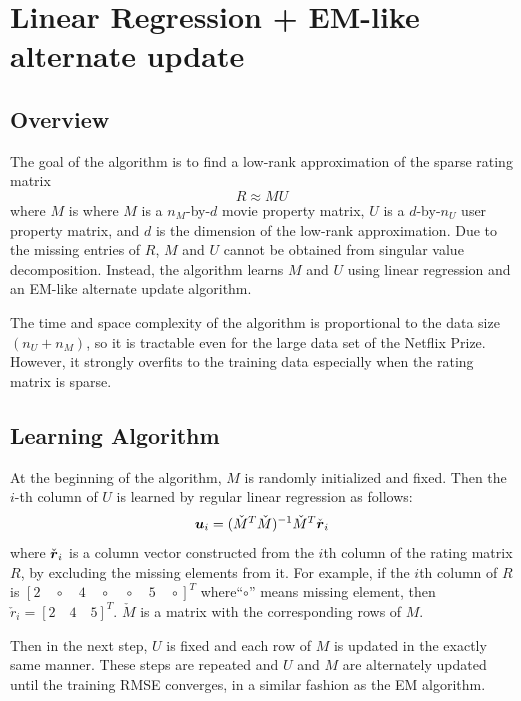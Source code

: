 \documentclass{article}
\begin{document}
\fi

\section{Linear Regression + EM-like alternate update}

\subsection{Overview}
The goal of the algorithm is to find a low-rank approximation of the sparse rating matrix 
\begin{equation}
R \approx MU
\end{equation}
where $M$ is where $M$ is a $n_M$-by-$d$ movie property matrix, $U$ is a
$d$-by-$n_U$ user property matrix, and $d$ is the dimension of the
low-rank approximation. Due to the missing entries of $R$, $M$ and $U$
cannot be obtained from singular value decomposition. Instead, the
algorithm learns $M$ and $U$ using linear regression and an EM-like
alternate update algorithm.

The time and space complexity of the algorithm is proportional to the
data size $(n_U+n_M)$, so it is tractable even for the large data set
of the Netflix Prize. However, it strongly overfits to the training
data especially when the rating matrix is sparse.

\subsection{Learning Algorithm}

At the beginning of the algorithm, $M$ is randomly initialized and
fixed. Then the $i$-th column of $U$ is learned by regular linear
regression as follows:
\begin{equation}
{\mbox{\boldmath $u$}}_i=(\check{M}^T\check{M})^{-1}\check{M}^T \check{{\mbox{\boldmath $r$}}}_i
\label{eq:lrem_core}
\end{equation}
where $\check{{\mbox{\boldmath $r$}}}_i$ is a column vector constructed from the $i$th column of the rating matrix $R$, by excluding the missing elements from it. For example, if the $i$th column of $R$ is $[2 \quad \circ \quad 4 \quad \circ \quad \circ \quad 5 \quad \circ]^T$ where``$\circ$'' means missing element, then $\check{r}_i = [2 \quad 4 \quad 5]^T$. $\check{M}$ is a matrix with the corresponding rows of $M$.

Then in the next step, $U$ is fixed and each row of $M$ is updated in
the exactly same manner. These steps are repeated and $U$ and $M$ are
alternately updated until the training RMSE converges, in a similar
fashion as the EM algorithm.
\end{document}
